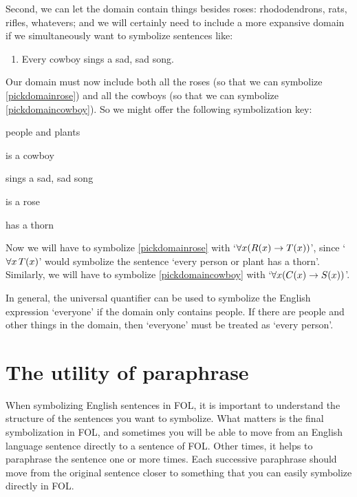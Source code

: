 Second, we can let the domain contain things besides roses: rhododendrons, rats, rifles,  whatevers; and we will certainly need to include a more expansive domain if we simultaneously want to symbolize sentences like:
	\begin{enumerate}
		\item\label{pickdomaincowboy} Every cowboy sings a sad, sad song.
	\end{enumerate}
Our domain must now include both all the roses (so that we can symbolize \cref*{pickdomainrose}) and all the cowboys (so that we can symbolize \cref*{pickdomaincowboy}). So we might offer the following symbolization key:
	\begin{ekey}
		\item[\text{domain}] people and plants
		\item[\atom{C}{x}]  is a cowboy
		\item[\atom{S}{x}]  sings a sad, sad song
		\item[\atom{R}{x}]  is a rose
		\item[\atom{T}{x}]  has a thorn
	\end{ekey}
Now we will have to symbolize \cref*{pickdomainrose} with `$\forall x (R(x) \rightarrow T(x))$', since `$\forall x\, T(x)$' would symbolize the sentence `every person or plant has a thorn'. Similarly, we will have to symbolize \cref*{pickdomaincowboy} with `$\forall x (C(x) \rightarrow S(x))$'.

In general, the universal quantifier can be used to symbolize the English expression `everyone' if the domain only contains people. If there are people and other things in the domain, then `everyone' must be treated as `every person'.


\section{The utility of paraphrase}
When symbolizing English sentences in FOL, it is important to understand the structure of the sentences you want to symbolize. What matters is the final symbolization in FOL, and sometimes you will be able to move from an English language sentence directly to a sentence of FOL. Other times, it helps to paraphrase the sentence one or more times. Each successive paraphrase should move from the original sentence closer to something that you can easily symbolize directly in FOL.

